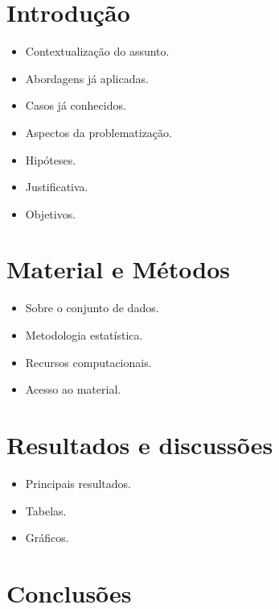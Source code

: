 \documentclass[portrait, 24pt, final]{sciposter}
\begin{document}
\begin{multicols}{2}

\begin{abstract}
  \lipsum[1-2]

\end{abstract}

\section*{Introdução}

\begin{itemize}
\item Contextualização do assunto.
\item Abordagens já aplicadas.
\item Casos já conhecidos.
\item Aspectos da problematização.
\item Hipóteses.
\item Justificativa.
\item Objetivos.
\end{itemize}

\section*{Material e Métodos}

\begin{itemize}
\item Sobre o conjunto de dados.
\item Metodologia estatística.
\item Recursos computacionais.
\item Acesso ao material.
\end{itemize}

\section*{Resultados e discussões}

\begin{itemize}
\item Principais resultados.
\item Tabelas.
\item Gráficos.
\end{itemize}

\section*{Conclusões}


\end{multicols}
\end{document}

